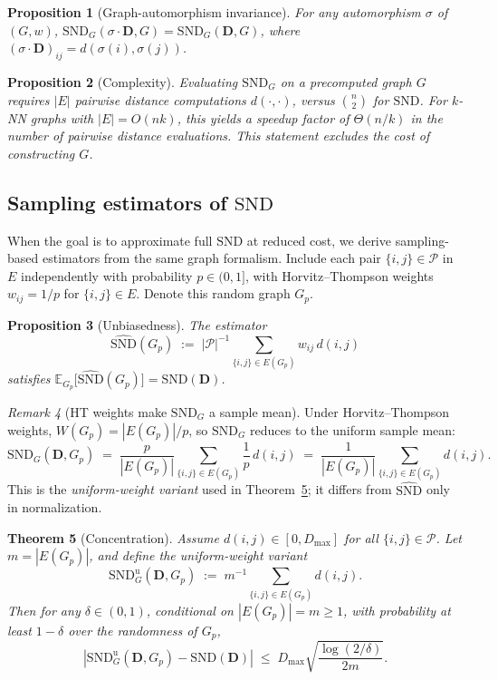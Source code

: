 \documentclass[11pt]{article}
\theoremstyle{plain}
\newtheorem{theorem}{Theorem}
\newtheorem{proposition}[theorem]{Proposition}
\theoremstyle{definition}
\theoremstyle{remark}
\newtheorem{remark}[theorem]{Remark}
\newcommand{\E}{\mathbb{E}}
\newcommand{\Pairs}{\mathcal{P}}         %
\newcommand{\SND}{\ensuremath{\mathrm{SND}}}
\newcommand{\SNDG}{\mathrm{SND}_{G}}
\newcommand{\abs}[1]{\left\lvert #1 \right\rvert}
\begin{document}
\begin{proposition}[Graph-automorphism invariance]
\label{prop:perm}
For any automorphism $\sigma$ of $(G, w)$,
$\SNDG(\sigma \cdot \mathbf{D}, G) = \SNDG(\mathbf{D}, G)$, where
$(\sigma \cdot \mathbf{D})_{ij} = d(\sigma(i), \sigma(j))$.
\end{proposition}

\begin{proposition}[Complexity]
\label{prop:complexity}
Evaluating $\SNDG$ on a precomputed graph $G$ requires $|E|$ pairwise
distance computations $d(\cdot,\cdot)$, versus $\binom{n}{2}$ for $\SND$.
For $k$-NN graphs with $|E| = O(nk)$, this yields a speedup factor of
$\Theta(n/k)$ in the number of pairwise distance evaluations. This
statement excludes the cost of constructing $G$.
\end{proposition}

\subsection{Sampling estimators of $\SND$}
\label{sec:method:estimator}

When the goal is to approximate full $\SND$ at reduced cost, we derive
sampling-based estimators from the same graph formalism. Include each pair
$\{i,j\} \in \Pairs$ in $E$ independently with probability $p \in (0, 1]$,
with Horvitz--Thompson weights $w_{ij} = 1/p$ for $\{i,j\} \in E$. Denote
this random graph $G_p$.

\begin{proposition}[Unbiasedness]
\label{prop:unbiased}
The estimator
\[
\widehat{\SND}(G_p) \;:=\; |\Pairs|^{-1}
\sum_{\{i,j\} \in E(G_p)} w_{ij}\, d(i,j)
\]
satisfies $\E_{G_p}\bigl[\widehat{\SND}(G_p)\bigr] = \SND(\mathbf{D})$.
\end{proposition}

\begin{remark}[HT weights make $\SNDG$ a sample mean]
\label{rem:ht-sample-mean}
Under Horvitz--Thompson weights, $W(G_p) = |E(G_p)|/p$, so $\SNDG$ reduces
to the uniform sample mean:
\[
\SNDG(\mathbf{D}, G_p)
\;=\; \frac{p}{|E(G_p)|} \sum_{\{i,j\} \in E(G_p)} \frac{1}{p}\, d(i,j)
\;=\; \frac{1}{|E(G_p)|} \sum_{\{i,j\} \in E(G_p)} d(i,j).
\]
This is the \emph{uniform-weight variant} used in
Theorem~\ref{thm:concentration}; it differs from \mbox{$\widehat{\SND}$} only in normalization.
\end{remark}

\begin{theorem}[Concentration]
\label{thm:concentration}
Assume $d(i,j) \in [0, D_{\max}]$ for all $\{i,j\} \in \Pairs$. Let
$m = |E(G_p)|$, and define the uniform-weight variant
\[
\SNDG^{\mathrm{u}}(\mathbf{D}, G_p) \;:=\; m^{-1}
\sum_{\{i,j\} \in E(G_p)} d(i,j).
\]
Then for any $\delta \in (0,1)$, conditional on $|E(G_p)| = m \geq 1$,
with probability at least $1 - \delta$ over the randomness of $G_p$,
\begin{equation}
\label{eq:concentration}
\abs{\SNDG^{\mathrm{u}}(\mathbf{D}, G_p) - \SND(\mathbf{D})}
\;\leq\; D_{\max} \sqrt{\frac{\log(2/\delta)}{2m}}.
\end{equation}
\end{theorem}
\end{document}
